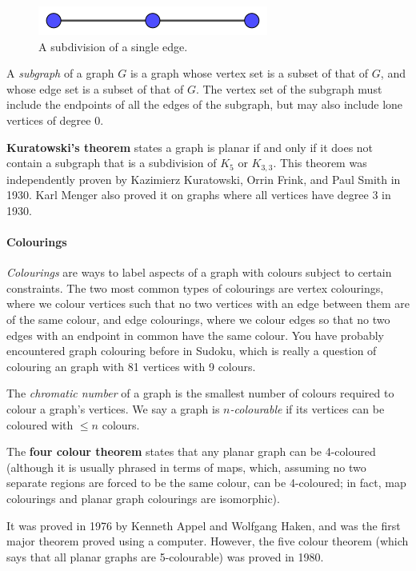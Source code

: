 \begin{figure}[h]
\centering
\includegraphics{subdivision.png}
\caption{A subdivision of a single edge.}
\label{subdivision}
\end{figure}



A \textit{subgraph} of a graph \(G\) is a graph whose vertex set is a subset of that of \(G\), and whose edge set is a subset of that of \(G\). The vertex set of the subgraph must include the endpoints of all the edges of the subgraph, but may also include lone vertices of degree 0.

\textbf{Kuratowski's theorem} states a graph is planar if and only if it does not contain a subgraph that is a subdivision of \(K_5\) or \(K_{3,3}\). This theorem was independently proven by Kazimierz Kuratowski, Orrin Frink, and Paul Smith in 1930. Karl Menger also proved it on graphs where all vertices have degree 3 in 1930.

\paragraph{Colourings}

\textit{Colourings} are ways to label aspects of a graph with colours subject to certain constraints. The two most common types of colourings are vertex colourings, where we colour vertices such that no two vertices with an edge between them are of the same colour, and edge colourings, where we colour edges so that no two edges with an endpoint in common have the same colour. You have probably encountered graph colouring before in Sudoku, which is really a question of colouring an graph with 81 vertices with 9 colours.

The \textit{chromatic number} of a graph is the smallest number of colours required to colour a graph's vertices. We say a graph is \textit{\(n\)-colourable} if its vertices can be coloured with \(\leq{}n\) colours.

The \textbf{four colour theorem} states that any planar graph can be 4-coloured (although it is usually phrased in terms of maps, which, assuming no two separate regions are forced to be the same colour, can be 4-coloured; in fact, map colourings and planar graph colourings are isomorphic).

It was proved in 1976 by Kenneth Appel and Wolfgang Haken, and was the first major theorem proved using a computer. However, the five colour theorem (which says that all planar graphs are 5-colourable) was proved in 1980.

